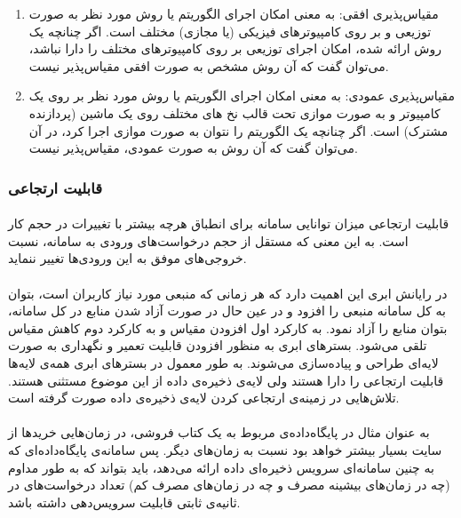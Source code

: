 \begin{enumerate}
	\item
مقیاس‌پذیری افقی:
به معنی امکان اجرای الگوریتم یا روش مورد نظر به صورت توزیعی و بر روی کامپیوتر‌های فیزیکی (یا مجازی) مختلف است. اگر چنانچه یک روش ارائه شده، امکان اجرای توزیعی بر روی کامپیوترهای مختلف را دارا نباشد، می‌توان گفت که آن روش مشخص به صورت افقی مقیاس‌پذیر نیست.
	\item
مقیاس‌پذیری عمودی:
به معنی امکان اجرای الگوریتم یا روش مورد نظر بر روی یک کامپیوتر و به صورت موازی
تحت قالب نخ
های
مختلف روی یک ماشین (پردازنده مشترک) است. اگر چنانچه یک الگوریتم را نتوان به صورت موازی اجرا کرد، در آن می‌توان گفت که آن روش به صورت عمودی، مقیاس‌پذیر نیست.

\end{enumerate}

\subsubsection*{قابلیت ارتجاعی }
\paragraph*{}
قابلیت ارتجاعی میزان توانایی سامانه برای انطباق هرچه بیشتر با تغییرات در حجم کار است. به این معنی که مستقل از حجم درخواست‌های ورودی به سامانه، نسبت خروجی‌های موفق به این ورودی‌ها تغییر ننماید.
\cite{becker-2015}

\paragraph*{}
در رایانش ابری
این اهمیت دارد که هر زمانی که منبعی مورد نیاز کاربران است، بتوان به کل سامانه منبعی را افزود و در عین حال در صورت آزاد شدن منابع در کل سامانه، بتوان منابع را آزاد نمود. به کارکرد اول افزودن مقیاس
و به کارکرد دوم کاهش مقیاس
تلقی می‌شود.
\cite{elastras-2010}
بسترهای ابری به منظور افزودن قابلیت تعمیر و نگهداری
به صورت لایه‌ای طراحی و پیاده‌سازی می‌شوند.
\cite{giriraj-2012}
به طور معمول در بسترهای ابری همه‌ی لایه‌ها قابلیت ارتجاعی را دارا هستند ولی لایه‌ی ذخیره‌ی داده از این موضوع مستثنی هستند. تلاش‌هایی در زمینه‌ی ارتجاعی کردن لایه‌ی ذخیره‌ی داده صورت گرفته است.
\cite{elasca-2013}

\paragraph*{}
به عنوان مثال در پایگاه‌داده‌ی مربوط به یک کتاب فروشی، در زمان‌هایی خریدها از سایت بسیار بیشتر خواهد بود نسبت به زمان‌های دیگر. پس سامانه‌ی پایگاه‌داده‌ای که به چنین سامانه‌ای سرویس ذخیره‌ای داده ارائه می‌دهد، باید بتواند که به طور مداوم (چه در زمان‌های بیشینه مصرف و چه در زمان‌های مصرف کم) تعداد درخواست‌های در ثانیه‌ی ثابتی قابلیت سرویس‌دهی داشته باشد.
\cite{becker-2015}


